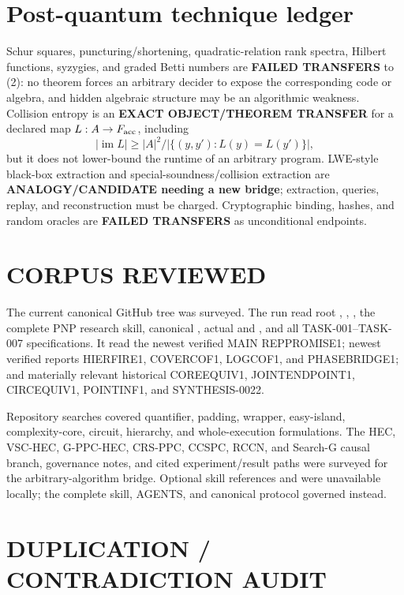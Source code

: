 \documentclass[11pt]{article}
\begin{document}
\section{Post-quantum technique ledger}

Schur squares, puncturing/shortening, quadratic-relation rank spectra,
Hilbert functions, syzygies, and graded Betti numbers are
\textbf{FAILED TRANSFERS} to (2): no theorem forces an arbitrary decider to
expose the corresponding code or algebra, and hidden algebraic structure may
be an algorithmic weakness.  Collision entropy is an
\textbf{EXACT OBJECT/THEOREM TRANSFER} for a declared map
\(L:A\to F_{\rm acc}\), including
\[
 |\operatorname{im}L|\ge |A|^2/
 |\{(y,y'):L(y)=L(y')\}|,
\]
but it does not lower-bound the runtime of an arbitrary program.  LWE-style
black-box extraction and special-soundness/collision extraction are
\textbf{ANALOGY/CANDIDATE needing a new bridge}; extraction, queries, replay,
and reconstruction must be charged.  Cryptographic binding, hashes, and
random oracles are \textbf{FAILED TRANSFERS} as unconditional endpoints.

\section{CORPUS REVIEWED}

The current canonical GitHub tree was surveyed.  The run read root
, , , the complete PNP research
skill, canonical , actual 
and , and all TASK-001--TASK-007 specifications.  It read the
newest verified MAIN REPPROMISE1; newest verified reports HIERFIRE1,
COVERCOF1, LOGCOF1, and PHASEBRIDGE1; and materially relevant historical
COREEQUIV1, JOINTENDPOINT1, CIRCEQUIV1, POINTINF1, and SYNTHESIS-0022.

Repository searches covered quantifier, padding, wrapper, easy-island,
complexity-core, circuit, hierarchy, and whole-execution formulations.  The
HEC, VSC-HEC, G-PPC-HEC, CRS-PPC, CCSPC, RCCN, and Search-G causal branch,
governance notes, and cited experiment/result paths were surveyed for the
arbitrary-algorithm bridge.  Optional skill references
 and
 were unavailable locally; the complete
skill, AGENTS, and canonical protocol governed instead.

\section{DUPLICATION / CONTRADICTION AUDIT}
\end{document}
